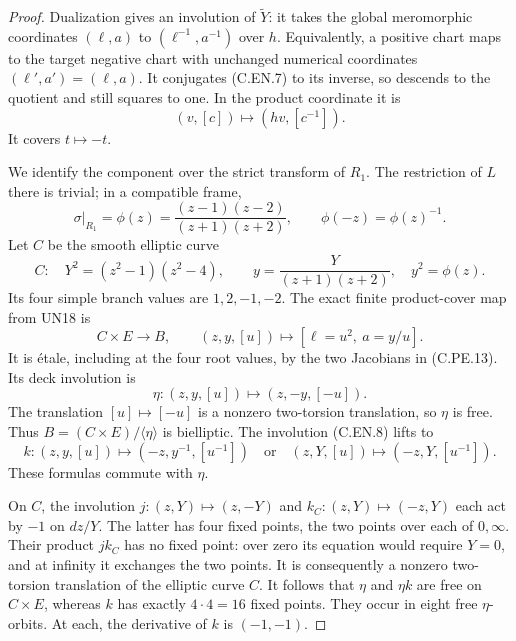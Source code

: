 \begin{proof}
Dualization gives an involution of
$\widetilde Y$: it takes the global meromorphic
coordinates $(\ell,a)$ to $(\ell^{-1},a^{-1})$
over $h$. Equivalently, a positive chart maps
to the target negative chart with unchanged
numerical coordinates $(\ell',a')=(\ell,a)$.
It conjugates (C.EN.7) to its inverse, so
descends to the quotient and still squares
to one. In the product coordinate it is
\[
                       (v,[c])\longmapsto(hv,[c^{-1}]).
                                                               \tag{C.EN.8}
\]
It covers $t\mapsto-t$.

We identify the component over the strict
transform of $R_1$. The restriction of $L$
there is trivial; in a compatible frame,
\[
 \sigma|_{R_1}=\phi(z)
   =\frac{(z-1)(z-2)}{(z+1)(z+2)},\qquad
                    \phi(-z)=\phi(z)^{-1}.          \tag{C.EN.9}
\]
Let $C$ be the smooth elliptic curve
\[
 C:\quad Y^2=(z^2-1)(z^2-4),\qquad
 y=\frac{Y}{(z+1)(z+2)},\quad y^2=\phi(z).
                                                               \tag{C.EN.10}
\]
Its four simple branch values are $1,2,-1,-2$.
The exact finite product-cover map from UN18 is
\[
 C\times E\longrightarrow B,\qquad
 (z,y,[u])\longmapsto[\ell=u^2,\ a=y/u].
                                                               \tag{C.EN.11}
\]
It is \'etale, including at the four root values,
by the two Jacobians in (C.PE.13). Its deck
involution is
\[
 \eta:(z,y,[u])\longmapsto(z,-y,[-u]).
                                                               \tag{C.EN.12}
\]
The translation $[u]\mapsto[-u]$ is a nonzero
two-torsion translation, so $\eta$ is free.
Thus $B=(C\times E)/\langle\eta\rangle$ is
bielliptic. The involution (C.EN.8) lifts to
\[
 k:(z,y,[u])\longmapsto(-z,y^{-1},[u^{-1}])
       \quad\text{or}\quad
       (z,Y,[u])\longmapsto(-z,Y,[u^{-1}]).
                                                               \tag{C.EN.13}
\]
These formulas commute with $\eta$.

On $C$, the involution $j:(z,Y)\mapsto(z,-Y)$
and $k_C:(z,Y)\mapsto(-z,Y)$ each act by $-1$
on $dz/Y$. The latter has four fixed points,
the two points over each of $0,\infty$.
Their product $jk_C$ has no fixed point:
over zero its equation would require $Y=0$,
and at infinity it exchanges the two points.
It is consequently a nonzero two-torsion
translation of the elliptic curve $C$.
It follows that $\eta$ and $\eta k$ are
free on $C\times E$, whereas $k$ has exactly
$4\cdot4=16$ fixed points. They occur in
eight free $\eta$-orbits. At each, the
derivative of $k$ is $(-1,-1)$.


\end{proof}
